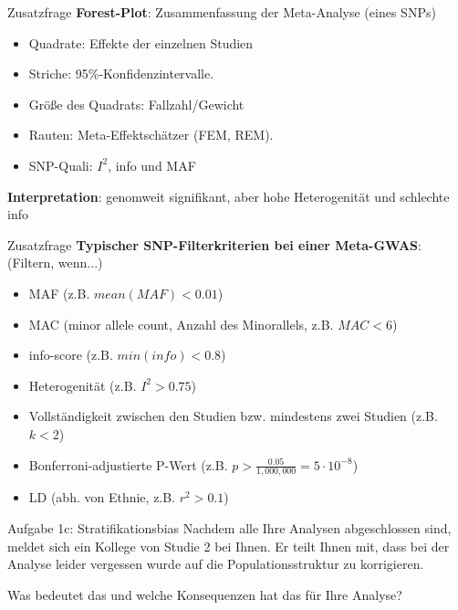 \documentclass{beamer}
\begin{document}
\begin{frame}{Zusatzfrage}
    \textbf{Forest-Plot}: Zusammenfassung der Meta-Analyse (eines SNPs)

    \begin{itemize}
        \item Quadrate: Effekte der einzelnen Studien
        \item Striche: 95\%-Konfidenzintervalle. 
        \item Größe des Quadrats: Fallzahl/Gewicht
        \item Rauten: Meta-Effektschätzer (FEM, REM).
        \item SNP-Quali: $I^2$, info und MAF 
    \end{itemize}

    \textbf{Interpretation}: genomweit signifikant, aber hohe Heterogenität und schlechte info

\end{frame}

\begin{frame}{Zusatzfrage}
    \textbf{Typischer SNP-Filterkriterien bei einer Meta-GWAS}: (Filtern, wenn...) 
    
    \begin{itemize}
        \item MAF (z.B. $mean(MAF)<0.01$)
        \item MAC (minor allele count, Anzahl des Minorallels, z.B. $MAC<6$)
        \item info-score (z.B. $min(info)<0.8$)
        \item Heterogenität (z.B. $I^2>0.75$) 
        \item Vollständigkeit zwischen den Studien bzw. mindestens zwei Studien (z.B. $k<2$)
        \item Bonferroni-adjustierte P-Wert (z.B. $p> \frac{0.05}{1,000,000} = 5 \cdot 10^{-8}$)
        \item LD (abh. von Ethnie, z.B. $r^2>0.1$)
    \end{itemize}

\end{frame}

\begin{frame}{Aufgabe 1c: Stratifikationsbias}
Nachdem alle Ihre Analysen abgeschlossen sind, meldet sich ein Kollege von Studie 2 bei Ihnen. Er teilt Ihnen mit, dass bei der Analyse leider vergessen wurde auf die Populationsstruktur zu korrigieren. 

Was bedeutet das und welche Konsequenzen hat das für Ihre Analyse? 

\end{frame}
\end{document}
